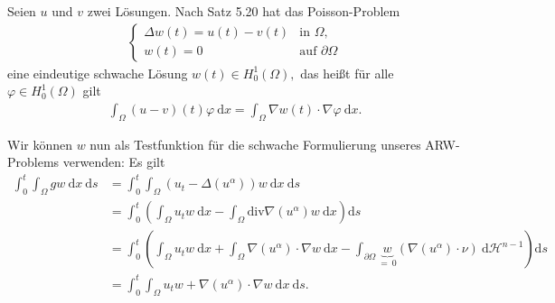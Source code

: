 
\begin{exercise}

\phantom{}

\end{exercise}


\begin{solution}

\phantom{}
Seien $u$ und $v$ zwei Lösungen. Nach Satz 5.20 hat das Poisson-Problem
\begin{align}\label{poisson}
\begin{cases}
\Delta w(t) = u(t) - v(t) &\text{in~} \Omega,\\
w(t) = 0 &\text{auf~} \partial\Omega
\end{cases}
\end{align}
eine eindeutige schwache Lösung $w(t) \in H_0^1(\Omega),$ das heißt für alle $\varphi \in H_0^1(\Omega)$ gilt
\begin{align}\label{schwach}
    \int_\Omega (u-v)(t) \varphi \mathrm{~d}x = \int_\Omega \nabla w(t) \cdot \nabla \varphi \mathrm{~d}x.
\end{align}

Wir können $w$ nun als Testfunktion für die schwache Formulierung unseres ARW-Problems verwenden: Es gilt
\begin{align*}
    \int_0^t \int_\Omega gw \mathrm{~d}x \mathrm{~d}s
    &= \int_0^t \int_\Omega \left(u_t - \Delta(u^\alpha)\right) w \mathrm{~d}x \mathrm{~d}s \\
    &= \int_0^t \left(\int_\Omega u_t w \mathrm{~d}x - \int_\Omega \mathrm{div}\nabla(u^\alpha) w \mathrm{~d}x\right) \mathrm{d}s\\
    &= \int_0^t \left(\int_\Omega u_t w \mathrm{~d}x + \int_\Omega \nabla(u^\alpha) \cdot \nabla w \mathrm{~d}x - \int_{\partial\Omega} \underbrace{w}_{=~0}(\nabla(u^\alpha)\cdot\nu) \mathrm{~d}\mathcal{H}^{n-1}\right) \mathrm{d}s\\
    &= \int_0^t \int_\Omega u_t w + \nabla(u^\alpha) \cdot \nabla w \mathrm{~d}x \mathrm{~d}s.
\end{align*}


\end{solution}
